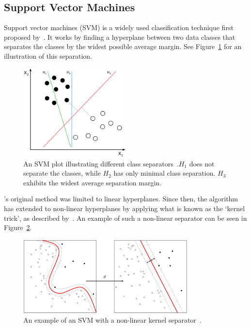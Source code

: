 \subsection{Support Vector Machines}

Support vector machines (SVM) is a widely used classification technique first proposed by~\cite{vapnik1995support}. It works by finding a hyperplane between two data classes that separates the classes by the widest possible average margin. See Figure~\ref{fig:chap2-svm-linear} for an illustration of this separation.

\begin{figure}
  \centering
  \includegraphics[width=0.5\textwidth]{figures/chapter2/svm_linear}
  \caption[SVM with linear hyperplane.]{An SVM plot illustrating different class separators~\citep{svm-wiki-pic}.\@ $H_1$ does not separate the classes, while $H_2$ has only minimal class separation. $H_3$ exhibits the widest average separation margin.}
\label{fig:chap2-svm-linear}
\end{figure}

\citeauthor{vapnik1995support}'s original method was limited to linear hyperplanes. Since then, the algorithm has extended to non-linear hyperplanes by applying what is known as the `kernel trick', as described by~\cite{amari1999improving}. An example of such a non-linear separator can be seen in Figure~\ref{fig:chap2-svm-nonlinear}.

\begin{figure}
  \centering
  \includegraphics[width=0.8\textwidth]{figures/chapter2/svm_nonlinear}
  \caption[An example of an SVM with a non-linear kernel separator.]{An example of an SVM with a non-linear kernel separator~\citep{kernel-wiki-pic}.}
\label{fig:chap2-svm-nonlinear}
\end{figure}

